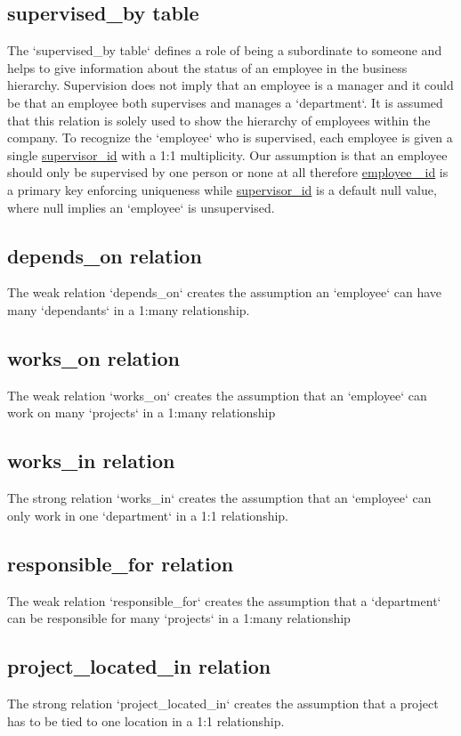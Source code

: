 \documentclass[11pt,letterpaper]{article}
\begin{document}
\subsection{supervised\_by table}
The `supervised\_by table` defines a role of being a subordinate to someone and helps to give information about the status of an employee in the business hierarchy. Supervision does not imply that an employee is a manager and it could be that an employee both supervises and manages a `department`. It is assumed that this relation is solely used to show the hierarchy of employees within the company. To recognize the `employee` who is supervised, each employee is given a single \uline{supervisor\_id} with a 1:1 multiplicity. Our assumption is that an employee should only be supervised by one person or none at all therefore \uline{employee \_id} is a primary key enforcing uniqueness while \uline{supervisor\_id} is a default null value, where null implies an `employee` is unsupervised.\\

\subsection{depends\_on relation}
	The weak relation  `depends\_on` creates the assumption an `employee` can have many `dependants` in a 1:many relationship.
	
\subsection{works\_on relation}
	The weak relation `works\_on` creates the assumption that an `employee` can work on many `projects` in a 1:many relationship
\subsection{works\_in relation}
The strong relation `works\_in` creates the assumption that an `employee` can only work in one `department` in a 1:1 relationship.
\subsection{responsible\_for relation}
	The weak relation `responsible\_for` creates the assumption that a `department` can be responsible for many `projects` in a 1:many relationship
\subsection{project\_located\_in relation}
The strong relation `project\_located\_in` creates the assumption that a project has to be tied to one location in a 1:1 relationship.
\end{document}
